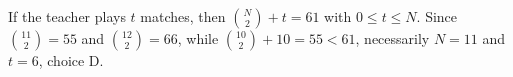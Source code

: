If the teacher plays $t$ matches, then $\binom N2+t=61$ with $0\le t\le N$. Since $\binom{11}2=55$ and $\binom{12}2=66$, while $\binom{10}2+10=55<61$, necessarily $N=11$ and $\boxed{t=6}$, choice D.
